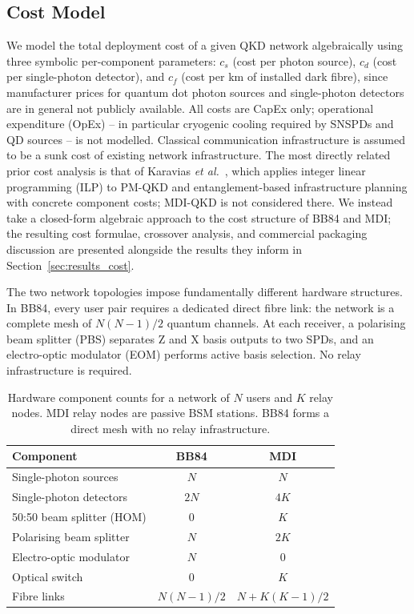 \documentclass[12pt]{article}
\begin{document}
\subsection{Cost Model}
\label{sec:cost_model}

We model the total deployment cost of a given QKD network algebraically using three symbolic per-component parameters: $c_s$ (cost per photon source), $c_d$ (cost per single-photon detector), and $c_f$ (cost per km of installed dark fibre), since manufacturer prices for quantum dot photon sources and single-photon detectors are in general not publicly available. All costs are CapEx only; operational expenditure (OpEx) -- in particular cryogenic cooling required by SNSPDs and QD sources -- is not modelled. Classical communication infrastructure is assumed to be a sunk cost of existing network infrastructure. The most directly related prior cost analysis is that of Karavias \textit{et al.}~\cite{DBLP:conf/ondm/KaraviasHBLP25}, which applies integer linear programming (ILP) to PM-QKD and entanglement-based infrastructure planning with concrete component costs; MDI-QKD is not considered there. We instead take a closed-form algebraic approach to the cost structure of BB84 and MDI; the resulting cost formulae, crossover analysis, and commercial packaging discussion are presented alongside the results they inform in Section~\ref{sec:results_cost}.

The two network topologies impose fundamentally different hardware structures. In BB84, every user pair requires a dedicated direct fibre link: the network is a complete mesh of $N(N-1)/2$ quantum channels. At each receiver, a polarising beam splitter (PBS) separates Z and X basis outputs to two SPDs, and an electro-optic modulator (EOM) performs active basis selection. No relay infrastructure is required.

\begin{table}[htbp]
\centering
\begin{tabular}{lcc}
\toprule
Component & BB84 & MDI \\
\midrule
Single-photon sources   & $N$                   & $N$ \\
Single-photon detectors & $2N$                  & $4K$ \\
50:50 beam splitter (HOM) & 0                   & $K$ \\
Polarising beam splitter  & $N$                 & $2K$ \\
Electro-optic modulator   & $N$                 & 0 \\
Optical switch            & 0                   & $K$ \\
Fibre links & $N(N-1)/2$ & $N + K(K-1)/2$ \\
\bottomrule
\end{tabular}
\caption{Hardware component counts for a network of $N$ users and $K$ relay nodes. MDI relay nodes are passive BSM stations. BB84 forms a direct mesh with no relay infrastructure.}
\label{tab:components}
\end{table}
\end{document}
